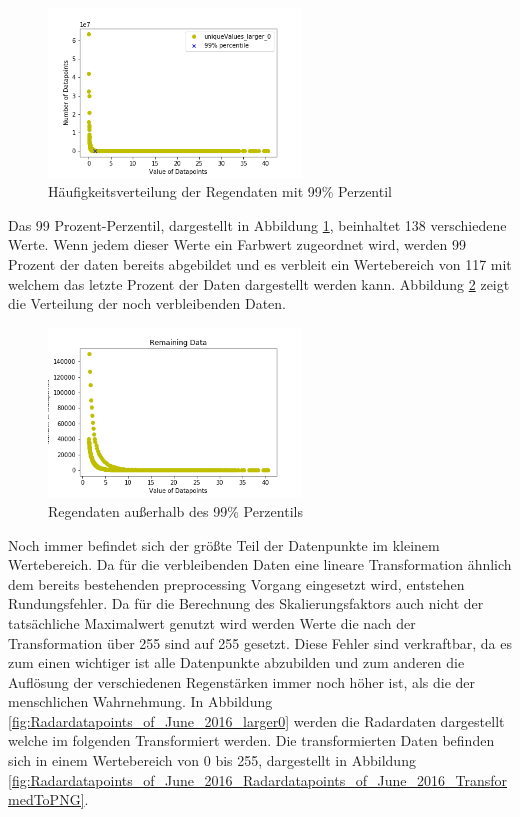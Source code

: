 \begin{figure}[H]
    \centering
    \includegraphics[width=0.6\textwidth,angle=0]{abb/Radardatapoints_of_June_2016_larger0_99percentile.png}
    \caption[Datenaufbereitung]{Häufigkeitsverteilung der Regendaten mit 99\% Perzentil}
    \label{fig:Radardatapoints_of_June_2016_larger0_99percentile}
\end{figure}

Das 99 Prozent-Perzentil, dargestellt in Abbildung \ref{fig:Radardatapoints_of_June_2016_larger0_99percentile}, beinhaltet 138 verschiedene Werte. Wenn jedem dieser Werte ein Farbwert zugeordnet wird, werden 99 Prozent der daten bereits abgebildet und es verbleit ein Wertebereich von 117 mit welchem das letzte Prozent der Daten dargestellt werden kann.
Abbildung \ref{fig:Radardatapoints_of_June_2016_RemainingData} zeigt die Verteilung der noch verbleibenden Daten.

\begin{figure}[H]
    \centering
    \includegraphics[width=0.6\textwidth,angle=0]{abb/Radardatapoints_of_June_2016_RemainingData.png}
    \caption[Datenaufbereitung]{Regendaten außerhalb des 99\% Perzentils}
    \label{fig:Radardatapoints_of_June_2016_RemainingData}
\end{figure}

Noch immer befindet sich der größte Teil der Datenpunkte im kleinem Wertebereich. Da für die verbleibenden Daten eine lineare Transformation ähnlich dem bereits bestehenden preprocessing Vorgang eingesetzt wird, entstehen Rundungsfehler.
Da für die Berechnung des Skalierungsfaktors auch nicht der tatsächliche Maximalwert genutzt wird werden Werte die nach der Transformation über 255 sind auf 255 gesetzt.
Diese Fehler sind verkraftbar, da es zum einen wichtiger ist alle Datenpunkte abzubilden und zum anderen die Auflösung der verschiedenen Regenstärken immer noch höher ist, als die der menschlichen Wahrnehmung.
In Abbildung \ref{fig:Radardatapoints_of_June_2016_larger0} werden die Radardaten dargestellt welche im folgenden Transformiert werden.
Die transformierten Daten befinden sich in einem Wertebereich von 0 bis 255, dargestellt in Abbildung \ref{fig:Radardatapoints_of_June_2016_Radardatapoints_of_June_2016_TransformedToPNG}.

